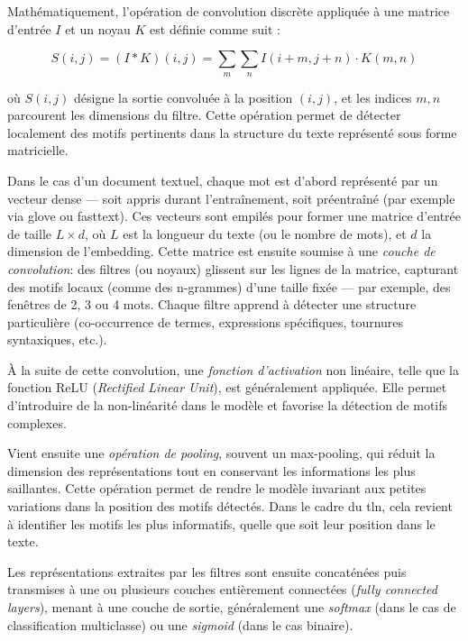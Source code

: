 \documentclass[12pt]{report}
\begin{document}
Mathématiquement, l’opération de convolution discrète appliquée à une matrice d’entrée \( I \) et un noyau \( K \) est définie comme suit :

\begin{equation}
S(i, j) = (I * K)(i, j) = \sum_m \sum_n I(i + m, j + n) \cdot K(m, n)
\end{equation}

où \( S(i,j) \) désigne la sortie convoluée à la position \( (i,j) \), et les indices \( m,n \) parcourent les dimensions du filtre. Cette opération permet de détecter localement des motifs pertinents dans la structure du texte représenté sous forme matricielle.

Dans le cas d’un document textuel, chaque mot est d’abord représenté par un vecteur dense — soit appris durant l’entraînement, soit préentraîné (par exemple via \gls{glove} ou \gls{fasttext}). Ces vecteurs sont empilés pour former une matrice d’entrée de taille $L \times d$, où $L$ est la longueur du texte (ou le nombre de mots), et $d$ la dimension de l’embedding. Cette matrice est ensuite soumise à une \textit{couche de convolution}: des filtres (ou noyaux) glissent sur les lignes de la matrice, capturant des motifs locaux (comme des n-grammes) d’une taille fixée — par exemple, des fenêtres de 2, 3 ou 4 mots. Chaque filtre apprend à détecter une structure particulière (co-occurrence de termes, expressions spécifiques, tournures syntaxiques, etc.).

À la suite de cette convolution, une \textit{fonction d’activation} non linéaire, telle que la fonction ReLU (\textit{Rectified Linear Unit}), est généralement appliquée. Elle permet d’introduire de la non-linéarité dans le modèle et favorise la détection de motifs complexes.

Vient ensuite une \textit{opération de pooling}, souvent un max-pooling, qui réduit la dimension des représentations tout en conservant les informations les plus saillantes. Cette opération permet de rendre le modèle invariant aux petites variations dans la position des motifs détectés. Dans le cadre du \gls{tln}, cela revient à identifier les motifs les plus informatifs, quelle que soit leur position dans le texte.

Les représentations extraites par les filtres sont ensuite concaténées puis transmises à une ou plusieurs couches entièrement connectées (\textit{fully connected layers}), menant à une couche de sortie, généralement une \textit{softmax} (dans le cas de classification multiclasse) ou une \textit{sigmoid} (dans le cas binaire).
\end{document}

